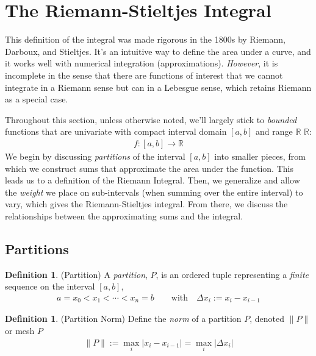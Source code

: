 \documentclass[12pt]{book}
\numberwithin{equation}{section} %
\theoremstyle{plain}
\theoremstyle{definition}
\newtheorem{defn}[thm]{Definition}
\theoremstyle{remark}
\newcommand{\R}{\mathbb{R}}
\begin{document}
\section{The Riemann-Stieltjes Integral}

This definition of the integral was made rigorous in the 1800s by
Riemann, Darboux, and Stieltjes.  It's an intuitive way to define the
area under a curve, and it works well with numerical integration
(approximations). \emph{However}, it is incomplete in the sense that
there are functions of interest that we cannot integrate in a Riemann
sense but can in a Lebesgue sense, which retains Riemann as a special
case.

Throughout this section, unless otherwise noted, we'll largely stick to
\emph{bounded} functions that are univariate with compact interval
domain $[a,b]$ and range $\R$
$\mathbb{R}$:
\begin{align*}
  f: [a, b] \rightarrow \mathbb{R}
\end{align*}
We begin by discussing \emph{partitions} of the interval $[a,b]$
into smaller pieces, from which we construct sums that approximate
the area under the function. This leads us to a definition of the
Riemann Integral. Then, we generalize and allow the \emph{weight} we
place on sub-intervals (when summing over the entire interval) to vary,
which gives the Riemann-Stieltjes integral. From there, we discuss the
relationships between the approximating sums and the integral.

\subsection{Partitions}

\begin{defn}(Partition)
A \emph{partition}, $P$, is an ordered tuple representing a
\emph{finite} sequence on the interval $[a,b]$,
\begin{align*}
  a = x_0 < x_1 < \cdots < x_n = b
  \qquad \text{with} \quad \Delta x_i := x_i - x_{i-1}
\end{align*}
\end{defn}

\begin{defn}(Partition Norm)
Define the \emph{norm} of a partition $P$, denoted $\lVert P\rVert$ or
mesh $P$
\begin{align*}
  \lVert P \rVert := \max_i |x_i - x_{i-1}| = \max_i |\Delta x_i|
\end{align*}
\end{defn}
\end{document}

